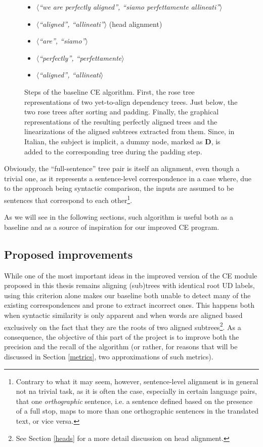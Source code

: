 \begin{figure}[H]
\begin{itemize}
 \item $\langle$\textit{``we are perfectly aligned'', ``siamo perfettamente allineati''}$\rangle$
 \item $\langle$\textit{``aligned'', ``allineati''}$\rangle$ (head alignment)
 \item $\langle$\textit{``are'', ``siamo''}$\rangle$
 \item $\langle$\textit{``perfectly'', ``perfettamente}$\rangle$
 \item $\langle$\textit{``aligned'', ``allineati}$\rangle$
 \end{itemize}
 \caption[Steps of the baseline CE algorithm.]{Steps of the baseline CE algorithm. First, the rose tree representations of two yet-to-align dependency trees. Just below, the two rose trees after sorting and padding. Finally, the graphical representations of the resulting perfectly aligned trees and the linearizations of the aligned subtrees extracted from them. Since, in Italian, the subject is implicit, a dummy node, marked as \textbf{D}, is added to the corresponding tree during the padding step.}
 \label{prefal}
\end{figure}

Obviously, the ``full-sentence'' tree pair is itself an alignment, even though a trivial one, as it represents a sentence-level correspondence in a case where, due to the approach being syntactic comparison, the inputs are assumed to be sentences that correspond to each other\footnote{Contrary to what it may seem, however, sentence-level alignment is in general not na trivial task, as it is often the case, especially in certain language pairs, that one \textit{orthographic} sentence, i.e. a sentence defined based on the presence of a full stop, maps to more than one orthographic sentences in the translated text, or vice versa.}.

As we will see in the following sections, such algorithm is useful both as a baseline and as a source of inspiration for our improved CE program.

\subsection{Proposed improvements} \label{improvements}
While one of the most important ideas in the improved version of the CE module proposed in this thesis remains aligning (sub)trees with identical root UD labels, using this criterion alone makes our baseline both unable to detect many of the existing correspondences and prone to extract incorrect ones. This happens both when syntactic similarity is only apparent and when words are aligned based exclusively on the fact that they are the roots of two aligned subtrees\footnote{See Section \ref{heads} for a more detail discussion on head alignment.}.
As a consequence, the objective of this part of the project is to improve both the precision and the recall of the algorithm (or rather, for reasons that will be discussed in Section \ref{metrics}, two approximations of such metrics). 

